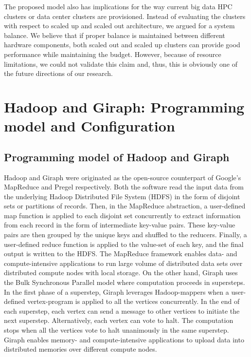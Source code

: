 \documentclass[journal]{IEEEtran}
\begin{document}
The proposed model also has implications for the way current big data HPC clusters or data center clusters are provisioned. Instead of evaluating the clusters with respect to scaled up and scaled out architecture, we argued for a system balance. We believe that if proper balance is maintained between different hardware components, both scaled out and scaled up clusters can provide good performance while maintaining the budget.  However, because of resource limitations, we could not validate this claim and, thus, this is obviously one of the future directions of our research.

\appendices
\section{Hadoop and Giraph: Programming model and Configuration}
 \label{app:HadoopConfigurationsAndoptimizations}
\subsection{Programming model of Hadoop and Giraph}
Hadoop and Giraph were originated as the open-source counterpart of Google's MapReduce \cite{fw:mapreduce} and Pregel \cite{fw:pregel} respectively. Both the software read the input data from the underlying Hadoop Distributed File System (HDFS) in the form of disjoint sets or partitions of records. Then, in the MapReduce abstraction, a user-defined map function is applied to each disjoint set concurrently to extract information from each record in the form of intermediate key-value pairs. These key-value pairs are then grouped by the unique keys and shuffled to the reducers. Finally, a user-defined reduce function is applied to the value-set of each key, and the final output is written to the HDFS. The MapReduce framework enables data- and compute-intensive applications to run large volume of distributed data sets over distributed compute nodes with local storage. On the other hand, Giraph uses the Bulk Synchronous Parallel model \cite{fw:bsp} where computation proceeds in supersteps. In the first phase of a superstep, Giraph leverages Hadoop-mappers when a user-defined vertex-program is applied to all the vertices concurrently. In the end of each superstep, each vertex can send a message to other vertices to initiate the next superstep. Alternatively, each vertex can vote to halt. The computation stops when all the vertices vote to halt unanimously in the same superstep. Giraph enables memory- and compute-intensive applications to upload data into distributed memories over different compute nodes.
 
\end{document}
